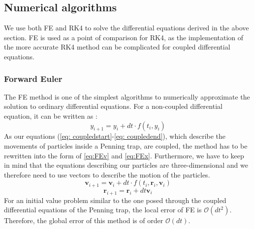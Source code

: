 \subsection*{Numerical algorithms}\label{sec:Algorithms}

We use both FE and RK4 to solve the differential equations derived in the above section.
FE is used as a point of comparison for RK4, as the implementation of the more accurate RK4 method can be complicated for coupled differential equations.

\subsubsection{Forward Euler}
The FE method is one of the simplest algorithms to numerically approximate the solution to ordinary differential equations. For a non-coupled differential equation, it can be written as \cite{Faul2016ACI}:
\begin{equation*}
    y_{i+1} = y_i + dt \cdot f(t_i,y_i)
\end{equation*}
As our equations (\cref{eq: coupledstart}-\cref{eq: coupledend}), which describe the movements of particles inside a Penning trap, are coupled, the method has to be rewritten into the form of \cref{eq:FEv} and \cref{eq:FEx}. Furthermore, we have to keep in mind that the equations describing our particles are three-dimensional and we therefore need to use vectors to describe the motion of the particles\cite{LectureNotes}. 
\begin{equation}\label{eq:FEv}
    \boldsymbol{v}_{i+1} = \boldsymbol{v}_i + dt \cdot f(t_i, \boldsymbol{r}_i, \boldsymbol{v}_i)
\end{equation}
\begin{equation}\label{eq:FEx}
    \boldsymbol{r}_{i+1} = \boldsymbol{r}_i + dt \boldsymbol{v}_i
\end{equation}
For an initial value problem similar to the one posed through the coupled differential equations of the Penning trap, the local error of FE is $\mathcal{O}(dt^2)$. 
Therefore, the global error of this method is of order $\mathcal{O}(dt)$.

